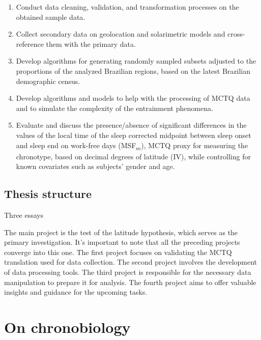 \documentclass[
12pt,
openright,
oneside,
a4paper,
chapter=TITLE,
section=TITLE,
french,
spanish,
brazil,
english
]{abntex2}\usepackage{array}
\begin{document}
\begin{enumerate}
\def\labelenumi{\roman{enumi})}
\item
  Conduct data cleaning, validation, and transformation processes on the
  obtained sample data.
\item
  Collect secondary data on geolocation and solarimetric models and
  cross-reference them with the primary data.
\item
  Develop algorithms for generating randomly sampled subsets adjusted to
  the proportions of the analyzed Brazilian regions, based on the latest
  Brazilian demographic census.
\item
  Develop algorithms and models to help with the processing of MCTQ data
  and to simulate the complexity of the entrainment phenomena.
\item
  Evaluate and discuss the presence/absence of significant differences
  in the values of the local time of the sleep corrected midpoint
  between sleep onset and sleep end on work-free days
  (MSF\textsubscript{sc}), MCTQ proxy for measuring the chronotype,
  based on decimal degrees of latitude (IV), while controlling for known
  covariates such as subjects' gender and age.
\end{enumerate}

\section{Thesis structure}\label{thesis-structure}

Three essays

The main project is the test of the latitude hypothesis, which serves as
the primary investigation. It's important to note that all the preceding
projects converge into this one. The first project focuses on validating
the MCTQ translation used for data collection. The second project
involves the development of data processing tools. The third project is
responsible for the necessary data manipulation to prepare it for
analysis. The fourth project aims to offer valuable insights and
guidance for the upcoming tasks.


\chapter{On chronobiology}\label{on-chronobiology}
\end{document}
